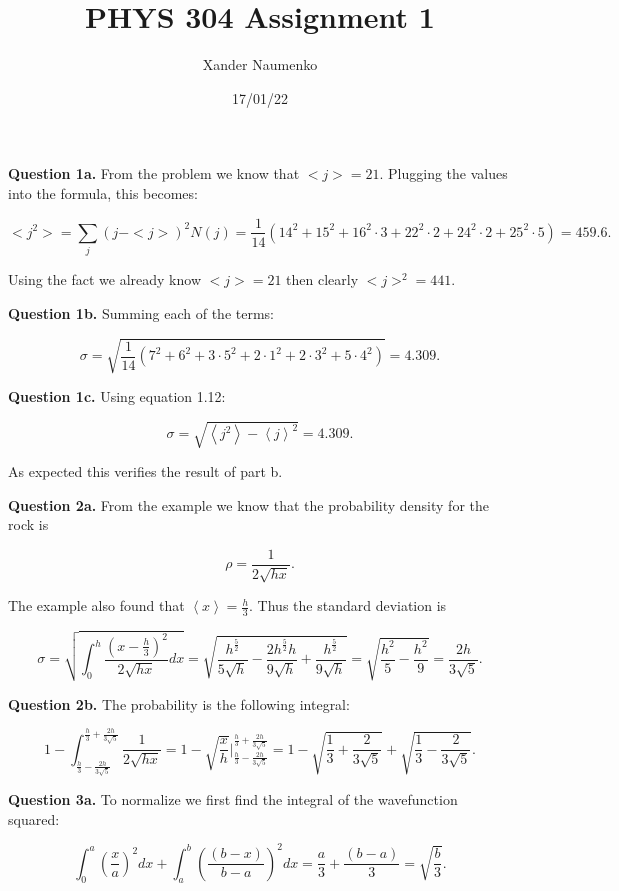 \documentclass[letterpaper, reqno,11pt]{article}
\begin{document}
\title{PHYS 304 Assignment 1}
\date{17/01/22}
\author{Xander Naumenko}
\maketitle

{\noindent\bf Question 1a.} From the problem we know that $<j> =21$. Plugging the values into the formula, this becomes: 

\[
<j^2> =\sum_j (j-<j>)^2 N(j)=\frac{1}{14}(14^2+15^2+16^2\cdot 3+22^2\cdot 2+24^2\cdot 2+25^2\cdot 5)=459.6
.\] 

Using the fact we already know $<j> =21$ then clearly $<j>^2=441$. 

{\noindent\bf Question 1b.} Summing each of the terms: 

\[
\sigma=\sqrt{\frac{1}{14}\left( 7^2+6^2+3\cdot 5^2+2\cdot 1^2+2\cdot 3^2+5\cdot 4^2 \right)} =4.309
.\] 

{\noindent\bf Question 1c.} Using equation 1.12: 

\[
\sigma=\sqrt{\left<j^2 \right>-\left<j \right>^2} =4.309
.\] 

As expected this verifies the result of part b. 

{\noindent\bf Question 2a.} From the example we know that the probability density for the rock is 

\[
\rho=\frac{1}{2\sqrt{hx} }
.\] 

The example also found that $\left<x \right> =\frac{h}{3}$. Thus the standard deviation is 

\[
\sigma=\sqrt{\int_0^h \frac{(x-\frac{h}{3})^2}{2\sqrt{hx} }dx } =\sqrt{\frac{h^{\frac{5}{2}}}{5\sqrt{h} }-\frac{2h^{\frac{5}{2}}h}{9\sqrt{h} }+\frac{h^{\frac{5}{2}}}{9\sqrt{h} }}=\sqrt{\frac{h^2}{5}-\frac{h^2}{9}}=\frac{2h}{3\sqrt{5} }
.\] 

{\noindent\bf Question 2b.} The probability is the following integral: 

\[
1-\int_{\frac{h}{3}-\frac{2h}{3\sqrt{5} }}^{\frac{h}{3}+\frac{2h}{3\sqrt{5}}}\frac{1}{2\sqrt{hx}}=1-\sqrt{\frac{x}{h}} \bigg|_{\frac{h}{3}-\frac{2h}{3\sqrt{5} }}^{\frac{h}{3}+\frac{2h}{3\sqrt{5}}}=1-\sqrt{\frac{1}{3}+\frac{2}{3\sqrt{5} }} +\sqrt{\frac{1}{3}-\frac{2}{3\sqrt{5}}}
.\] 

{\noindent\bf Question 3a.} To normalize we first find the integral of the wavefunction squared: 

\[
\int_0^a \left(\frac{x}{a}\right)^2dx + \int_a^b \left(\frac{(b-x)}{b-a}\right)^2dx=\frac{a}{3}+\frac{(b-a)}{3}=\sqrt{\frac{b}{3}}
.\] 
\end{document}
